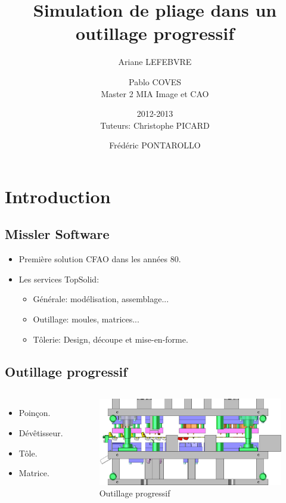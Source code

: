 \documentclass{beamer}
\title{Simulation de pliage dans un outillage progressif}
\author{Ariane LEFEBVRE \and Pablo COVES\\[.5cm] Master 2 MIA Image et CAO \and 2012-2013\\[.5cm] Tuteurs: Christophe PICARD \and Frédéric PONTAROLLO}
\date{}
\begin{document}
\maketitle

\section{Introduction}
\subsection{Missler Software}
\begin{frame}
    \begin{itemize}
        \item Première solution CFAO dans les années 80.
        \item Les services TopSolid:
            \begin{itemize}
                \item Générale: modélisation, assemblage...
                \item Outillage: moules, matrices...
                \item Tôlerie: Design, découpe et mise-en-forme.
            \end{itemize}
    \end{itemize}
\end{frame}
\subsection{Outillage progressif}
\begin{frame}
    \begin{columns}
        \begin{itemize}
            \item Poinçon.
            \item Dévêtisseur.
            \item Tôle.
            \item Matrice.
        \end{itemize}
        \begin{figure}
            \includegraphics[width=\textwidth]{img/dieTool.jpg}
            \caption{Outillage progressif}
        \end{figure}
    \end{columns}
\end{frame}
\end{document}
